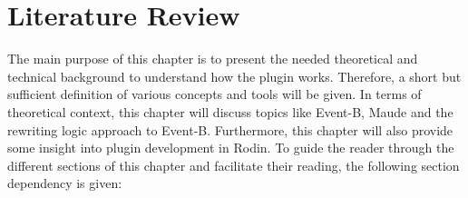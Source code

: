 \chapter{Literature Review}
The main purpose of this chapter is to present the needed theoretical and technical background to understand how the plugin works. Therefore, a short but sufficient definition of various concepts and tools will be given. In terms of theoretical context, this chapter will discuss topics like  Event-B, Maude and the rewriting logic approach to Event-B. Furthermore, this chapter will also provide some insight into plugin development in Rodin. To guide the reader through the different sections of this chapter and facilitate their reading, the following section dependency is given:



